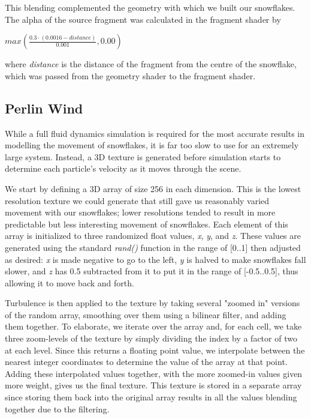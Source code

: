 \documentclass[conference]{acmsiggraph}
\begin{document}
This blending complemented the geometry with which we built our snowflakes. The alpha of the source fragment was calculated in the fragment shader by 

$max(\frac{0.3 \cdot (0.0016 - \textit{distance})} {0.001}, 0.00)$ 

where \textit{distance} is the distance of the fragment from the centre of the snowflake, which was passed from the geometry shader to the fragment shader.

\subsection{Perlin Wind}
While a full fluid dynamics simulation is required for the most accurate results in modelling the movement of snowflakes, it is far too slow to use for an extremely large system. Instead, a 3D texture is generated before simulation starts to determine each particle's velocity as it moves through the scene.

We start by defining a 3D array of size 256 in each dimension. This is the lowest resolution texture we could generate that still gave us reasonably varied movement with our snowflakes; lower resolutions tended to result in more predictable but less interesting movement of snowflakes. Each element of this array is initialized to three randomized float values, \textit{x}, \textit{y}, and \textit{z}. These values are generated using the standard \textit{rand()} function in the range of [0..1] then adjusted as desired: \textit{x} is made negative to go to the left, \textit{y} is halved to make snowflakes fall slower, and \textit{z} has 0.5 subtracted from it to put it in the range of [-0.5..0.5], thus allowing it to move back and forth.

Turbulence is then applied to the texture by taking several "zoomed in" versions of the random array, smoothing over them using a bilinear filter, and adding them together. To elaborate, we iterate over the array and, for each cell, we take three zoom-levels of the texture by simply dividing the index by a factor of two at each level. Since this returns a floating point value, we interpolate between the nearest integer coordinates to determine the value of the array at that point. Adding these interpolated values together, with the more zoomed-in values given more weight, gives us the final texture. This texture is stored in a separate array since storing them back into the original array results in all the values blending together due to the filtering.
\end{document}
